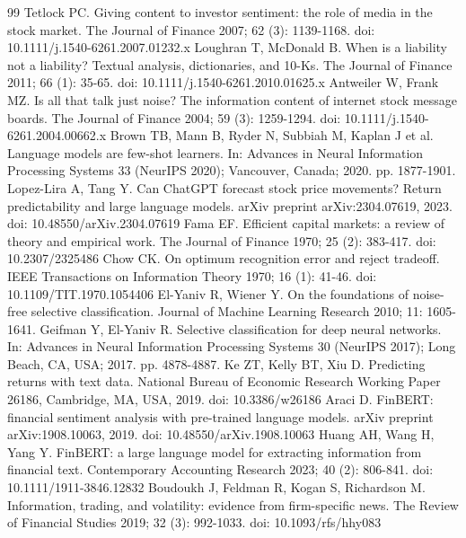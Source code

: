 \documentclass{elektr}
\begin{document}
\begin{thebibliography}{99}
 Tetlock PC. Giving content to investor sentiment: the role of media in the stock market. The Journal of Finance 2007; 62 (3): 1139-1168. doi: 10.1111/j.1540-6261.2007.01232.x
 Loughran T, McDonald B. When is a liability not a liability? Textual analysis, dictionaries, and 10-Ks. The Journal of Finance 2011; 66 (1): 35-65. doi: 10.1111/j.1540-6261.2010.01625.x
 Antweiler W, Frank MZ. Is all that talk just noise? The information content of internet stock message boards. The Journal of Finance 2004; 59 (3): 1259-1294. doi: 10.1111/j.1540-6261.2004.00662.x
 Brown TB, Mann B, Ryder N, Subbiah M, Kaplan J et al. Language models are few-shot learners. In: Advances in Neural Information Processing Systems 33 (NeurIPS 2020); Vancouver, Canada; 2020. pp. 1877-1901.
 Lopez-Lira A, Tang Y. Can ChatGPT forecast stock price movements? Return predictability and large language models. arXiv preprint arXiv:2304.07619, 2023. doi: 10.48550/arXiv.2304.07619
 Fama EF. Efficient capital markets: a review of theory and empirical work. The Journal of Finance 1970; 25 (2): 383-417. doi: 10.2307/2325486
 Chow CK. On optimum recognition error and reject tradeoff. IEEE Transactions on Information Theory 1970; 16 (1): 41-46. doi: 10.1109/TIT.1970.1054406
 El-Yaniv R, Wiener Y. On the foundations of noise-free selective classification. Journal of Machine Learning Research 2010; 11: 1605-1641.
 Geifman Y, El-Yaniv R. Selective classification for deep neural networks. In: Advances in Neural Information Processing Systems 30 (NeurIPS 2017); Long Beach, CA, USA; 2017. pp. 4878-4887.
 Ke ZT, Kelly BT, Xiu D. Predicting returns with text data. National Bureau of Economic Research Working Paper 26186, Cambridge, MA, USA, 2019. doi: 10.3386/w26186
 Araci D. FinBERT: financial sentiment analysis with pre-trained language models. arXiv preprint arXiv:1908.10063, 2019. doi: 10.48550/arXiv.1908.10063
 Huang AH, Wang H, Yang Y. FinBERT: a large language model for extracting information from financial text. Contemporary Accounting Research 2023; 40 (2): 806-841. doi: 10.1111/1911-3846.12832
 Boudoukh J, Feldman R, Kogan S, Richardson M. Information, trading, and volatility: evidence from firm-specific news. The Review of Financial Studies 2019; 32 (3): 992-1033. doi: 10.1093/rfs/hhy083

\end{thebibliography}
\end{document}

